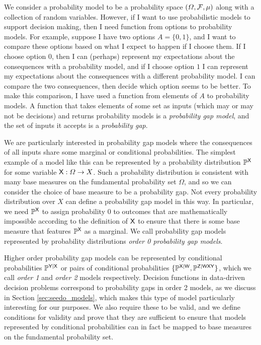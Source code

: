 We consider a probability model to be a probability space $(\Omega,\mathcal{F},\mu)$ along with a collection of random variables. However, if I want to use probabilistic models to support decision making, then I need function from options to probability models. For example, suppose I have two options $A=\{0,1\}$, and I want to compare these options based on what I expect to happen if I choose them. If I choose option $0$, then I can (perhaps) represent my expectations about the consequences with a probability model, and if I choose option $1$ I can represent my expectations about the consequences with a different probability model. I can compare the two consequences, then decide which option seems to be better. To make this comparison, I have used a function from elements of $A$ to probability models. A function that takes elements of some set as inputs (which may or may not be decisions) and returns probability models is a \emph{probability gap model}, and the set of inputs it accepts is a \emph{probability gap}.

We are particularly interested in probability gap models where the consequences of all inputs share some marginal or conditional probabilities. The simplest example of a model like this can be represented by a probability distribution $\mathbb{P}^{\mathsf{X}}$ for some variable $\mathsf{X}:\Omega\to X$. Such a probability distribution is consistent with many base measures on the fundamental probability set $\Omega$, and so we can consider the choice of base measure to be a probability gap. Not every probability distribution over $X$ can define a probability gap model in this way. In particular, we need $\mathbb{P}^{\mathsf{X}}$ to assign probability 0 to outcomes that are mathematically impossible according to the definition of $\mathsf{X}$ to ensure that there is some base measure that features $\mathbb{P}^{\mathsf{X}}$ as a marginal. We call probability gap models represented by probability distributions \emph{order 0 probability gap models}.

Higher order probability gap models can be represented by conditional probabilities $\mathbb{P}^{\mathsf{Y}|\mathsf{X}}$ or pairs of conditional probabilities $\{\mathbb{P}^{\mathsf{X}|\mathsf{W}},\mathbb{P}^{\mathsf{Z}|\mathsf{WXY}}\}$, which we call \emph{order 1} and \emph{order 2} models respectively. Decision functions in data-driven decision problems correspond to probability gaps in order 2 models, as we discuss in Section \ref{sec:seedo_models}, which makes this type of model particularly interesting for our purposes. We also require these to be valid, and we define conditions for validity and prove that they are sufficient to ensure that models represented by conditional probabilities can in fact be mapped to base measures on the fundamental probability set.

